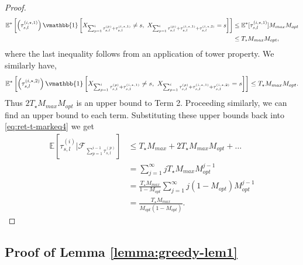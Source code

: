 \documentclass[opre,sglanonrev]{informs4}
\numberwithin{equation}{section}
\newcommand{\pow}[1]{^{(#1)}}
\newcommand{\lp}{\left(}
\newcommand{\rp}{\right)}
\newcommand{\lb}{\left[}
\newcommand{\rb}{\right]}
\newcommand{\Fcal}{\mathcal{F}}
\newcommand{\expec}{\mathbb{E}}
\newcommand{\indicator}{\vmathbb{1}}
\begin{document}
\begin{APPENDICES}
\begin{proof}
\begin{align*}
   \expec^*\lb\lp\tau_{s,l}\pow{i,\star,1}\rp\indicator\lb X_{\sum_{p=1}^i \tau_{s,l}\pow{p}+ \tau_{s,l}\pow{i,\star,1}}\neq s,\ X_{\sum_{p=1}^i \tau_{s,l}\pow{p}+ \tau_{s,l}\pow{i,\star,1}+ \tau_{s,l}\pow{i,\star,2}}=s\rb\rb & \leq \expec^*[\tau_{s,l}\pow{i,\star,1}] M_{max}M_{opt} \\
    & \leq  T_\star M_{max}M_{opt},
\end{align*}
where the last inequality follows from an application of tower property. We similarly have,
\[
   \expec^*\lb\lp\tau_{s,l}\pow{i,\star,2}\rp\indicator\lb X_{\sum_{p=1}^i \tau_{s,l}\pow{p}+ \tau_{s,l}\pow{i,\star,1}}\neq s,\ X_{\sum_{p=1}^i \tau_{s,l}\pow{p}+ \tau_{s,l}\pow{i,\star,1}+ \tau_{s,l}\pow{i,\star,2}}=s\rb\rb \leq  T_\star M_{max}M_{opt}.
\]
Thus $2T_\star M_{max}M_{opt}$ is an upper bound to Term 2. Proceeding similarly, we can find an upper bound to each term. Substituting these upper bounds back into \cref{eq:ret-t-markeq4} we get
\begin{align*}
    \expec\lb\tau_{s,l}\pow{i}|\Fcal_{\sum_{p=1}^{i-1} \tau_{s,l}\pow{p}}\rb & \leq  T_\star M_{max}+ 2T_\star M_{max}M_{opt}+\dots\\
    & = \sum_{j=1}^\infty jT_\star M_{max} M_{opt}^{j-1}\\
    & = \frac{T_\star M_{max}}{1-M_{opt}} \sum_{j=1}^\infty j(1-M_{opt})M_{opt}^{j-1}\\
    & = \frac{T_\star M_{max}}{M_{opt}(1-M_{opt})}.
\end{align*}
\end{proof}
\subsection{Proof of Lemma \ref{lemma:greedy-lem1}}


\end{APPENDICES}
\end{document}

